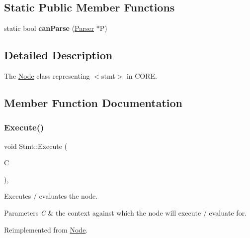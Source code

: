 \subsection*{Static Public Member Functions}
\begin{DoxyCompactItemize}
\item 
\mbox{\label{class_stmt_a4260c7325cc716d0e6e1958694fc11b1}} 
static bool {\bfseries can\+Parse} (\mbox{\hyperlink{class_parser}{Parser}} $\ast$P)
\end{DoxyCompactItemize}


\subsection{Detailed Description}
The \mbox{\hyperlink{class_node}{Node}} class representing {\ttfamily $<$stmt$>$} in C\+O\+RE. 

\subsection{Member Function Documentation}
\mbox{\label{class_stmt_a25f70d265d704c43b99d20442470bb71}} 
\subsubsection{\texorpdfstring{Execute()}{Execute()}}
{\footnotesize\ttfamily void Stmt\+::\+Execute (\begin{DoxyParamCaption}\item[{\mbox{\hyperlink{class_a_s_t_context}{A\+S\+T\+Context}} \&}]{C }\end{DoxyParamCaption})\hspace{0.3cm}{\ttfamily [override]}, {\ttfamily [virtual]}}

Executes / evaluates the node. 
\begin{DoxyParams}{Parameters}
{\em C} & the context against which the node will execute / evaluate for. \\
\hline
\end{DoxyParams}


Reimplemented from \mbox{\hyperlink{class_node_a27ad1ba81d2596817b361368282bcbfa}{Node}}.

\mbox{\label{class_stmt_a7d29a5e877b3fa073d3c2e9da3effb27}} 
